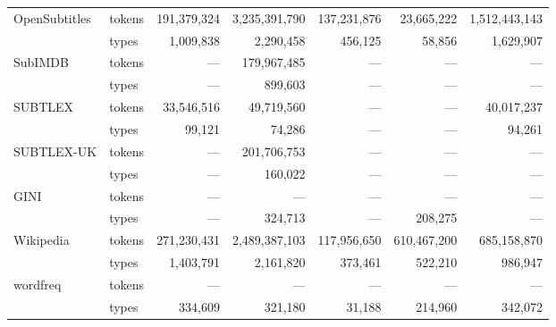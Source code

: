 \begin{tabular}{llrrrrr}
\multirow[c]{2}{*}{OpenSubtitles} & tokens & 191,379,324 & 3,235,391,790 & 137,231,876 & 23,665,222 & 1,512,443,143 \\
 & \cellcolor[HTML]{EEEEEE} types & \cellcolor[HTML]{EEEEEE} 1,009,838 & \cellcolor[HTML]{EEEEEE} 2,290,458 & \cellcolor[HTML]{EEEEEE} 456,125 & \cellcolor[HTML]{EEEEEE} 58,856 & \cellcolor[HTML]{EEEEEE} 1,629,907 \\
\multirow[c]{2}{*}{SubIMDB} & tokens & --- & 179,967,485 & --- & --- & --- \\
 & \cellcolor[HTML]{EEEEEE} types & \cellcolor[HTML]{EEEEEE} --- & \cellcolor[HTML]{EEEEEE} 899,603 & \cellcolor[HTML]{EEEEEE} --- & \cellcolor[HTML]{EEEEEE} --- & \cellcolor[HTML]{EEEEEE} --- \\
\multirow[c]{2}{*}{SUBTLEX} & tokens & 33,546,516 & 49,719,560 & --- & --- & 40,017,237 \\
 & \cellcolor[HTML]{EEEEEE} types & \cellcolor[HTML]{EEEEEE} 99,121 & \cellcolor[HTML]{EEEEEE} 74,286 & \cellcolor[HTML]{EEEEEE} --- & \cellcolor[HTML]{EEEEEE} --- & \cellcolor[HTML]{EEEEEE} 94,261 \\
\multirow[c]{2}{*}{SUBTLEX-UK} & tokens & --- & 201,706,753 & --- & --- & --- \\
 & \cellcolor[HTML]{EEEEEE} types & \cellcolor[HTML]{EEEEEE} --- & \cellcolor[HTML]{EEEEEE} 160,022 & \cellcolor[HTML]{EEEEEE} --- & \cellcolor[HTML]{EEEEEE} --- & \cellcolor[HTML]{EEEEEE} --- \\
\multirow[c]{2}{*}{GINI} & tokens & --- & --- & --- & --- & --- \\
 & \cellcolor[HTML]{EEEEEE} types & \cellcolor[HTML]{EEEEEE} --- & \cellcolor[HTML]{EEEEEE} 324,713 & \cellcolor[HTML]{EEEEEE} --- & \cellcolor[HTML]{EEEEEE} 208,275 & \cellcolor[HTML]{EEEEEE} --- \\
\multirow[c]{2}{*}{Wikipedia} & tokens & 271,230,431 & 2,489,387,103 & 117,956,650 & 610,467,200 & 685,158,870 \\
 & \cellcolor[HTML]{EEEEEE} types & \cellcolor[HTML]{EEEEEE} 1,403,791 & \cellcolor[HTML]{EEEEEE} 2,161,820 & \cellcolor[HTML]{EEEEEE} 373,461 & \cellcolor[HTML]{EEEEEE} 522,210 & \cellcolor[HTML]{EEEEEE} 986,947 \\
\multirow[c]{2}{*}{wordfreq} & tokens & --- & --- & --- & --- & --- \\
 & \cellcolor[HTML]{EEEEEE} types & \cellcolor[HTML]{EEEEEE} 334,609 & \cellcolor[HTML]{EEEEEE} 321,180 & \cellcolor[HTML]{EEEEEE} 31,188 & \cellcolor[HTML]{EEEEEE} 214,960 & \cellcolor[HTML]{EEEEEE} 342,072 \\

\end{tabular}
